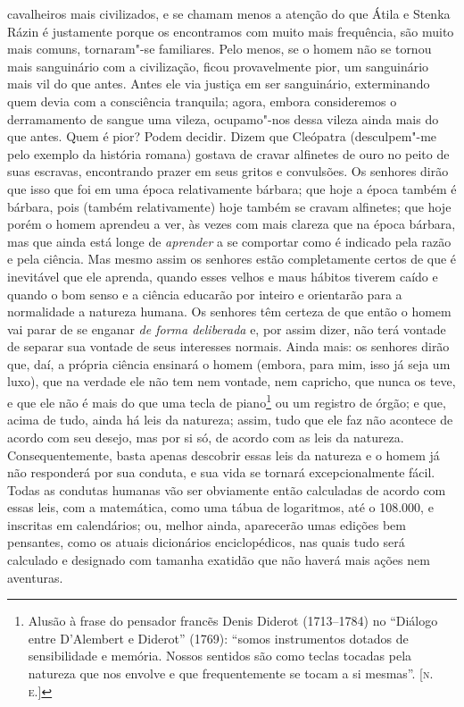 cavalheiros mais civilizados, e se chamam menos a atenção do que Átila e
Stenka Rázin é justamente porque os encontramos com muito mais
frequência, são muito mais comuns, tornaram"-se familiares. Pelo menos,
se o homem não se tornou mais sanguinário com a civilização, ficou
provavelmente pior, um sanguinário mais vil do que antes. Antes ele via
justiça em ser sanguinário, exterminando quem devia com a consciência
tranquila; agora, embora consideremos o derramamento de sangue uma
vileza, ocupamo"-nos dessa vileza ainda mais do que antes. Quem é pior?
Podem decidir. Dizem que Cleópatra (desculpem"-me pelo exemplo da
história romana) gostava de cravar alfinetes de ouro no peito de suas
escravas, encontrando prazer em seus gritos e convulsões. Os senhores
dirão que isso que foi em uma época relativamente bárbara; que hoje a
época também é bárbara, pois (também relativamente) hoje também se
cravam alfinetes; que hoje porém o homem aprendeu a ver, às vezes com
mais clareza que na época bárbara, mas que ainda está longe de
\emph{aprender} a se comportar como é indicado pela razão e pela
ciência. Mas mesmo assim os senhores estão completamente certos de que é
inevitável que ele aprenda, quando esses velhos e maus hábitos tiverem
caído e quando o bom senso e a ciência educarão por inteiro e orientarão
para a normalidade a natureza humana. Os senhores têm certeza de que
então o homem vai parar de se enganar \emph{de forma deliberada} e, por
assim dizer, não terá vontade de separar sua vontade de seus interesses
normais. Ainda mais: os senhores dirão que, daí, a própria ciência
ensinará o homem (embora, para mim, isso já seja um luxo), que na
verdade ele não tem nem vontade, nem capricho, que nunca os teve, e que
ele não é mais do que uma tecla de piano\footnote{Alusão à frase do
  pensador francẽs Denis Diderot (1713--1784) no ``Diálogo entre
  D'Alembert e Diderot'' (1769): ``somos instrumentos dotados de
  sensibilidade e memória. Nossos sentidos são como teclas tocadas pela
  natureza que nos envolve e que frequentemente se tocam a si mesmas''.
  {[}\textsc{n.\,e.}{]}} ou um registro de órgão; e que, acima de tudo, ainda há
leis da natureza; assim, tudo que ele faz não acontece de acordo com seu
desejo, mas por si só, de acordo com as leis da natureza.
Consequentemente, basta apenas descobrir essas leis da natureza e o
homem já não responderá por sua conduta, e sua vida se tornará
excepcionalmente fácil. Todas as condutas humanas vão ser obviamente
então calculadas de acordo com essas leis, com a matemática, como uma
tábua de logaritmos, até o 108.000, e inscritas em calendários; ou,
melhor ainda, aparecerão umas edições bem pensantes, como os atuais
dicionários enciclopédicos, nas quais tudo será calculado e designado
com tamanha exatidão que não haverá mais ações nem aventuras.

